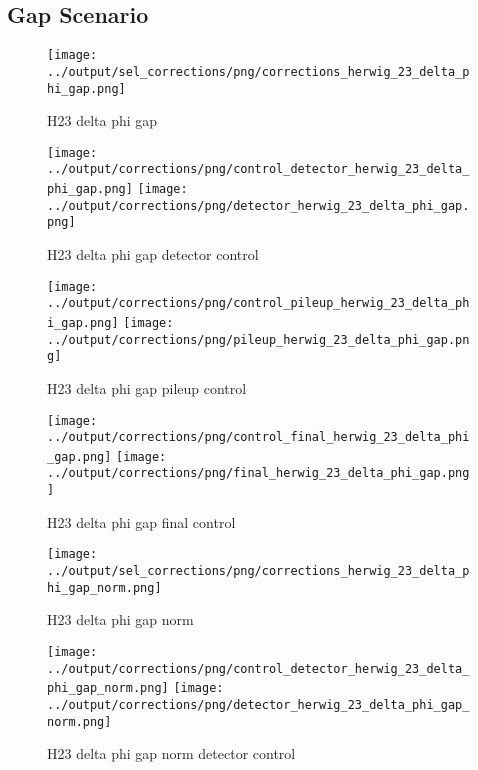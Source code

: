 \documentclass[11pt]{book}
\begin{document}
\clearpage
\subsection{Gap Scenario}


\begin{figure}[ht]
\centering
\texttt{[image: ../output/sel\_corrections/png/corrections\_herwig\_23\_delta\_phi\_gap.png]}
\caption{H23 delta phi gap}
\label{fig:H23_delta_phi_gap}
\end{figure}

\begin{figure}[ht]
\centering
\texttt{[image: ../output/corrections/png/control\_detector\_herwig\_23\_delta\_phi\_gap.png]}
\texttt{[image: ../output/corrections/png/detector\_herwig\_23\_delta\_phi\_gap.png]}
\caption{H23 delta phi gap detector control}
\label{fig:H23_delta_phi_gap_detector_control}
\end{figure}

\begin{figure}[ht]
\centering
\texttt{[image: ../output/corrections/png/control\_pileup\_herwig\_23\_delta\_phi\_gap.png]}
\texttt{[image: ../output/corrections/png/pileup\_herwig\_23\_delta\_phi\_gap.png]}
\caption{H23 delta phi gap pileup control}
\label{fig:H23_delta_phi_gap_pileup_control}
\end{figure}


\begin{figure}[ht]
\centering
\texttt{[image: ../output/corrections/png/control\_final\_herwig\_23\_delta\_phi\_gap.png]}
\texttt{[image: ../output/corrections/png/final\_herwig\_23\_delta\_phi\_gap.png]}
\caption{H23 delta phi gap final control}
\label{fig:H23_delta_phi_gap_final_control}
\end{figure}


\begin{figure}[ht]
\centering
\texttt{[image: ../output/sel\_corrections/png/corrections\_herwig\_23\_delta\_phi\_gap\_norm.png]}
\caption{H23 delta phi gap norm}
\label{fig:H23_delta_phi_gap_norm}
\end{figure}

\begin{figure}[ht]
\centering
\texttt{[image: ../output/corrections/png/control\_detector\_herwig\_23\_delta\_phi\_gap\_norm.png]}
\texttt{[image: ../output/corrections/png/detector\_herwig\_23\_delta\_phi\_gap\_norm.png]}
\caption{H23 delta phi gap norm detector control}
\label{fig:H23_delta_phi_gap_norm_detector_control}
\end{figure}
\end{document}
